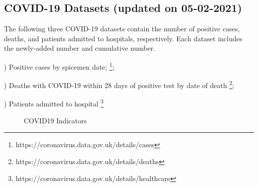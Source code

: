 \documentclass[12pt, a4paper]{report}
\begin{document}
\subsection{COVID-19 Datasets (updated on 05-02-2021)}
The following three COVID-19 datasets contain the number of positive cases, deaths, and patients admitted to hospitals, 
respectively. Each dataset includes the newly-added number and cumulative number.\par
{}) Positive cases by spicemen date;
\footnote[1]{https://coronavirus.data.gov.uk/details/cases};\par
{}) Deaths with COVID-19 within 28 days of positive test by date of death
\footnote[2]{https://coronavirus.data.gov.uk/details/deaths};\par
{}) Patients admitted to hospital
\footnote[3]{https://coronavirus.data.gov.uk/details/healthcare}\par
\begin{figure}[H]
\centering
    \caption{COVID19 Indicators}
    \label{Fig.main}
\end{figure}
\end{document}

